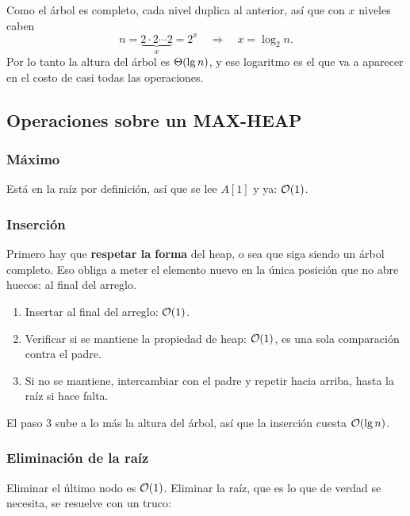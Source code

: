 \documentclass[11pt,letterpaper]{article}
\begin{document}
Como el árbol es completo, cada nivel duplica al anterior, así que con
$x$ niveles caben
\[
    n = \underbrace{2 \cdot 2 \cdots 2}_{x} = 2^{x}
    \quad \Longrightarrow \quad
    x = \log_2 n .
\]
Por lo tanto la altura del árbol es $\Theta\!\left(\lg n\right)$, y ese logaritmo es
el que va a aparecer en el costo de casi todas las operaciones.


\subsection*{Operaciones sobre un MAX-HEAP}

\subsubsection*{Máximo}

Está en la raíz por definición, así que se lee $A[1]$ y ya:
$\mathcal{O}\!\left(1\right)$.

\subsubsection*{Inserción}

Primero hay que \textbf{respetar la forma} del heap, o sea que siga
siendo un árbol completo. Eso obliga a meter el elemento nuevo en la
única posición que no abre huecos: al final del arreglo.

\begin{enumerate}[itemsep=0.2em]
  \item Insertar al final del arreglo: $\mathcal{O}\!\left(1\right)$.
  \item Verificar si se mantiene la propiedad de heap: $\mathcal{O}\!\left(1\right)$, es
        una sola comparación contra el padre.
  \item Si no se mantiene, intercambiar con el padre y repetir hacia
        arriba, hasta la raíz si hace falta.
\end{enumerate}

El paso 3 sube a lo más la altura del árbol, así que la inserción
cuesta $\mathcal{O}\!\left(\lg n\right)$.

\subsubsection*{Eliminación de la raíz}

Eliminar el último nodo es $\mathcal{O}\!\left(1\right)$. Eliminar la raíz, que es lo que
de verdad se necesita, se resuelve con un truco:
\end{document}
